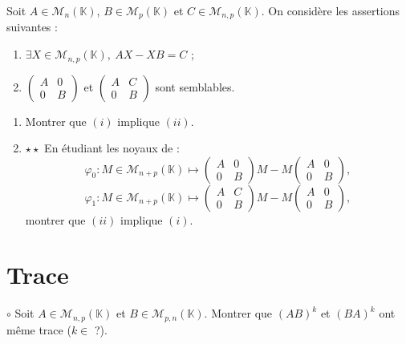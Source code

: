 \documentclass[french,a4paper]{article}
\newcommand{\K}{\mathbb{K}}
\theoremstyle{plain}
\theoremstyle{definition}
\theoremstyle{remark}
\begin{document}
\begin{ex}{}
	Soit $A\in\mathcal{M}_n(\K)$, $B\in\mathcal{M}_p(\K)$ et $C\in\mathcal{M}_{n,p}(\K)$. On considère les assertions suivantes :
	\begin{enumerate}[label=(\roman*)]
		\item $\exists X\in\mathcal{M}_{n,p}(\K),\ AX-XB=C$ ;
		\item $\displaystyle\begin{pmatrix}
			A&0\\
			0&B
		\end{pmatrix}$ et $\displaystyle\begin{pmatrix}
		A&C\\
		0&B
		\end{pmatrix}$ sont semblables.
	\end{enumerate}
	\begin{enumerate}
		\item Montrer que $(i)$ implique $(ii)$.
		\item $\star\star$ En étudiant les noyaux de : $$\varphi_0:M\in\mathcal{M}_{n+p}(\K)\mapsto \begin{pmatrix}
			A&0\\
			0&B
		\end{pmatrix}M-M\begin{pmatrix}
		A&0\\
		0&B
		\end{pmatrix},$$
		$$\varphi_1:M\in\mathcal{M}_{n+p}(\K)\mapsto \begin{pmatrix}
			A&C\\
			0&B
		\end{pmatrix}M-M\begin{pmatrix}
			A&0\\
			0&B
		\end{pmatrix},$$ montrer que $(ii)$ implique $(i)$.
	\end{enumerate}
\end{ex}

\section{Trace}

\begin{ex}{$\circ$}
	Soit $A\in\mathcal{M}_{n,p}(\K)$ et $B\in\mathcal{M}_{p,n}(\K)$. Montrer que $(AB)^k$ et $(BA)^k$ ont même trace ($k\in$ ?).
\end{ex}
\end{document}
